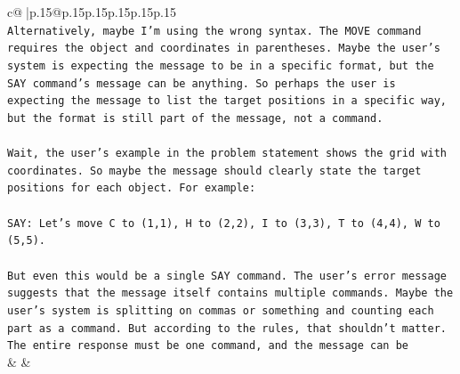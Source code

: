 \documentclass{article}
\begin{document}
{\begin{supertabular}{c@{$\;$}|p{.15\linewidth}@{}p{.15\linewidth}p{.15\linewidth}p{.15\linewidth}p{.15\linewidth}p{.15\linewidth}}
{{{\\ 
\texttt{Alternatively, maybe I'm using the wrong syntax. The MOVE command requires the object and coordinates in parentheses. Maybe the user's system is expecting the message to be in a specific format, but the SAY command's message can be anything. So perhaps the user is expecting the message to list the target positions in a specific way, but the format is still part of the message, not a command.} \\
\\ 
\texttt{Wait, the user's example in the problem statement shows the grid with coordinates. So maybe the message should clearly state the target positions for each object. For example:} \\
\\ 
\texttt{SAY: Let's move C to (1,1), H to (2,2), I to (3,3), T to (4,4), W to (5,5).} \\
\\ 
\texttt{But even this would be a single SAY command. The user's error message suggests that the message itself contains multiple commands. Maybe the user's system is splitting on commas or something and counting each part as a command. But according to the rules, that shouldn't matter. The entire response must be one command, and the message can be} \\
            }
        }
    }
    & & \\ \\


\end{supertabular}}
\end{document}
